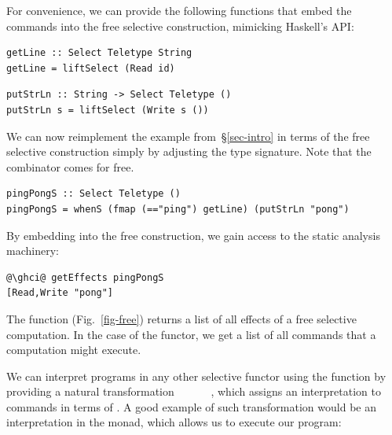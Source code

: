 \noindent
For convenience, we can provide the following functions that embed the commands
into the free selective construction, mimicking Haskell's  API:

\vspace{1mm}
\begin{verbatim}
getLine :: Select Teletype String
getLine = liftSelect (Read id)
\end{verbatim}
\vspace{0mm}
\begin{verbatim}
putStrLn :: String -> Select Teletype ()
putStrLn s = liftSelect (Write s ())
\end{verbatim}
\vspace{1mm}

\noindent
We can now reimplement the  example from~\S\ref{sec-intro} in
terms of the free selective construction simply by adjusting the type signature.
Note that the  combinator comes for free.

\vspace{1mm}
\begin{verbatim}
pingPongS :: Select Teletype ()
pingPongS = whenS (fmap (=="ping") getLine) (putStrLn "pong")
\end{verbatim}
\vspace{1mm}

\noindent
By embedding  into the free construction, we gain access to the
static analysis machinery:

\vspace{1mm}
\begin{verbatim}
@\ghci@ getEffects pingPongS
[Read,Write "pong"]
\end{verbatim}
\vspace{1mm}

\noindent
The  function (Fig.~\ref{fig-free}) returns a list of all effects
of a free selective computation. In the case of the  functor, we
get a list of all commands that a computation might execute.


We can interpret  programs in any other selective functor using
the  function by providing a natural transformation
~~~~\hs{->}~~, which assigns an
interpretation to  commands in terms of . A good example of
such transformation would be an interpretation in the  monad, which
allows us to execute our  program:

